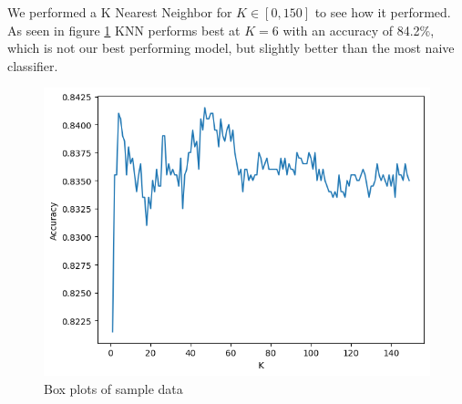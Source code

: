 We performed a K Nearest Neighbor for $K\in[0,150]$ to see how it performed.
As seen in figure \ref{fig:KNN} KNN performs best at $K=6$ with an accuracy of 84.2\%, which is not our best performing model, but slightly better than the most naive classifier.

\begin{figure}[h!]
    \centering
    \includegraphics[width=0.8\columnwidth]{Plots/KNN_150accuracy.png}
    \caption{Box plots of sample data}
    \label{fig:KNN}
\end{figure}
